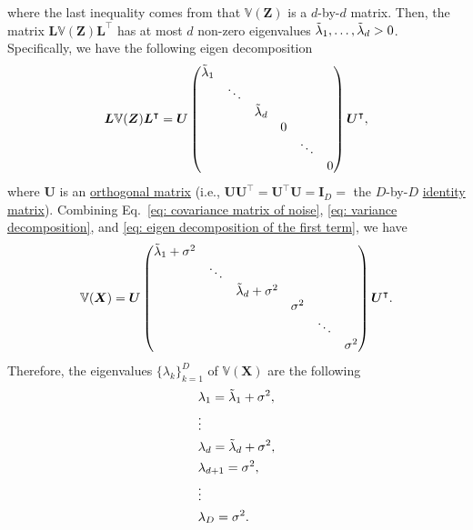 \documentclass[11pt,letterpaper, leqno]{article}
\numberwithin{equation}{section}
\numberwithin{theorem}{section}
\numberwithin{lemma}{section}
\numberwithin{corollary}{section}
\numberwithin{definition}{section}
\numberwithin{proposition}{section}
\numberwithin{remark}{section}
\numberwithin{example}{section}
\newcommand{\T}{\intercal}
\begin{document}
where the last inequality comes from that $\mathbb{V}(\boldsymbol{Z})$ is a $d$-by-$d$ matrix. Then, the matrix $\boldsymbol{L}\mathbb{V}(\boldsymbol{Z})\boldsymbol{L}^\T$ has at most $d$ non-zero eigenvalues $\Tilde{\lambda}_{1},\ldots, \Tilde{\lambda}_{d}>0$. Specifically, we have the following eigen decomposition
\begin{align}\label{eq: eigen decomposition of the first term}
    \boldsymbol{L}\mathbb{V}(\boldsymbol{Z})\boldsymbol{L}^\T = \boldsymbol{U} 
    \begin{pmatrix}
    \Tilde{\lambda}_{1} & & & & & \\
    & \ddots & & & & \\
    & & \Tilde{\lambda}_{d} & & & \\
    & & & 0 & & \\
    & & & & \ddots & \\
    & & & & & 0
  \end{pmatrix}
  \boldsymbol{U}^\T,
\end{align}
where $\boldsymbol{U}$ is an \href{https://en.wikipedia.org/wiki/Orthogonal_matrix}{orthogonal matrix} (i.e., $\boldsymbol{UU}^\T=\boldsymbol{U}^\T\boldsymbol{U}=\boldsymbol{I}_{D}=$ the $D$-by-$D$ \href{https://en.wikipedia.org/wiki/Identity_matrix}{identity matrix}). Combining Eq.~\eqref{eq: covariance matrix of noise}, \eqref{eq: variance decomposition}, and \eqref{eq: eigen decomposition of the first term}, we have
\begin{align}\label{eq: eigen variance decomposition}
    \mathbb{V}(\boldsymbol{X})=
    \boldsymbol{U} 
    \begin{pmatrix}
    \Tilde{\lambda}_{1} + \sigma^2 & & & & & \\
    & \ddots & & & & \\
    & & \Tilde{\lambda}_{d} + \sigma^2 & & & \\
    & & & \sigma^2 & & \\
    & & & & \ddots & \\
    & & & & & \sigma^2
  \end{pmatrix}
  \boldsymbol{U}^\T.
\end{align}
Therefore, the eigenvalues $\{\lambda_k\}_{k=1}^D$ of $\mathbb{V}(\boldsymbol{X})$ are the following
\begin{align}\label{eq: eigenvalue decomposition}
    \begin{aligned}
        & \lambda_1=\Tilde{\lambda}_{1} + \sigma^2,\\
    & \vdots \\
    & \lambda_d=\Tilde{\lambda}_{d} + \sigma^2, \\ 
    & \lambda_{d+1}=\sigma^2, \\
    & \vdots \\
    & \lambda_{D}=\sigma^2.
    \end{aligned}
\end{align}
\end{document}
